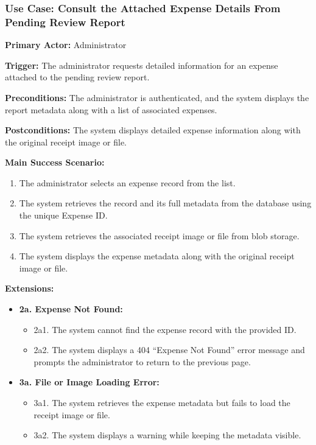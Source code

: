 \subsubsection{\textbf{Use Case: Consult the Attached Expense Details From Pending Review Report}}

\textbf{Primary Actor:} Administrator

\textbf{Trigger:} The administrator requests detailed information for an expense attached to the pending review report.

\textbf{Preconditions:} The administrator is authenticated, and the system displays the report metadata along with a list of associated expenses.

\textbf{Postconditions:} The system displays detailed expense information along with the original receipt image or file.

\vspace{0.5cm}

\textbf{Main Success Scenario:}

\begin{enumerate} [leftmargin=0.75cm, noitemsep]
\item The administrator selects an expense record from the list.
\item The system retrieves the record and its full metadata from the database using the unique Expense ID.
\item The system retrieves the associated receipt image or file from blob storage.
\item The system displays the expense metadata along with the original receipt image or file.
\end{enumerate}

\vspace{0.3cm}

\textbf{Extensions:}

\begin{itemize} [label={}, leftmargin=0.75cm, noitemsep]

    \item \textbf{2a. Expense Not Found:}
    \begin{itemize} [label={}, leftmargin=0.75cm, noitemsep]
        \item 2a1. The system cannot find the expense record with the provided ID.
        \item 2a2. The system displays a 404 ``Expense Not Found'' error message and prompts the administrator to return to the previous page.
    \end{itemize}

    \item \textbf{3a. File or Image Loading Error:}
    \begin{itemize} [label={}, leftmargin=0.75cm, noitemsep]
        \item 3a1. The system retrieves the expense metadata but fails to load the receipt image or file.
        \item 3a2. The system displays a warning while keeping the metadata visible.
    \end{itemize}

\end{itemize}

\vspace{0.3cm}
